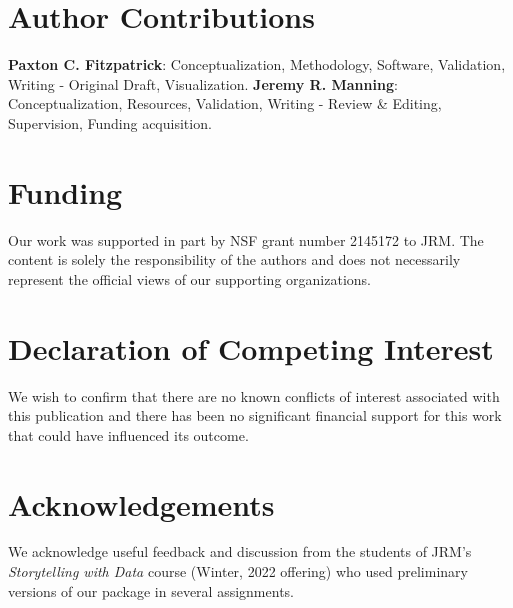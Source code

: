 \documentclass[preprint,12pt,a4paper]{elsarticle}
\begin{document}
\section*{Author Contributions}

\textbf{Paxton C. Fitzpatrick}: Conceptualization, Methodology,
Software, Validation, Writing - Original Draft,
Visualization. \textbf{Jeremy R. Manning}: Conceptualization,
Resources, Validation, Writing - Review \& Editing, Supervision,
Funding acquisition.

\section*{Funding}

Our work was supported in part by NSF grant number 2145172 to JRM.
The content is solely the responsibility of the authors and does not
necessarily represent the official views of our supporting
organizations.


\section*{Declaration of Competing Interest}

We wish to confirm that there are no known conflicts of interest
associated with this publication and there has been no significant
financial support for this work that could have influenced its
outcome.


\section*{Acknowledgements}

We acknowledge useful feedback and discussion from the students of
JRM's \textit{Storytelling with Data} course (Winter, 2022 offering)
who used preliminary versions of our package in several assignments.



\end{document}
